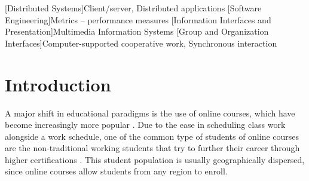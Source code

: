 \documentclass{sig-alternate}
\begin{document}
[Distributed Systems]{Client/server, Distributed applications}
[Software Engineering]{Metrics -- performance measures}
[Information Interfaces and Presentation]{Multimedia Information Systems}
[Group and Organization Interfaces]{Computer-supported cooperative work, Synchronous interaction}




%
%
%
%
%
%
%


\section{Introduction}
A major shift in educational paradigms is the use of online courses,
which have become increasingly more popular \cite{BELLER,DOE}.  Due to
the ease in scheduling class work alongside a work schedule, one of the common
type of students of online courses are the non-traditional working
students that try to further their career through higher
certifications \cite{BURGESS}.  This student population is usually
geographically dispersed, since online courses allow students from any
region to enroll.  
\end{document}
